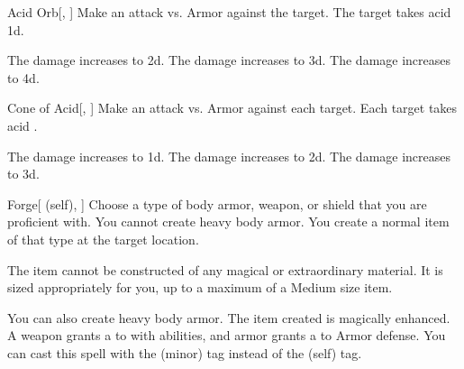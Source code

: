 \lowercase{\hypertarget{spell:Acid Orb}{}}\label{spell:Acid Orb}
\begin{freeability}[Rank 1]{\hypertarget{spell:Acid Orb}{Acid Orb}}[, ]
Make an attack vs. Armor against the target.
\hit The target takes acid  \plus1d.

\rankline
{} The damage increases to  \plus2d.
 The damage increases to  \plus3d.
 The damage increases to  \plus4d.
\end{freeability}
\vspace{0.25em}



\lowercase{\hypertarget{spell:Cone of Acid}{}}\label{spell:Cone of Acid}
\begin{freeability}[Rank 1]{\hypertarget{spell:Cone of Acid}{Cone of Acid}}[, ]
Make an attack vs. Armor against each target.
\hit Each target takes acid .

\rankline
{} The damage increases to  \plus1d.
 The damage increases to  \plus2d.
 The damage increases to  \plus3d.
\end{freeability}
\vspace{0.25em}



\lowercase{\hypertarget{spell:Forge}{}}\label{spell:Forge}
\begin{attuneability}[Rank 1]{\hypertarget{spell:Forge}{Forge}}[ (self), ]
Choose a type of body armor, weapon, or shield that you are proficient with.
You cannot create heavy body armor.
You create a normal item of that type at the target location.

The item cannot be constructed of any magical or extraordinary material.
It is sized appropriately for you, up to a maximum of a Medium size item.

\rankline
{} You can also create heavy body armor.
 The item created is magically enhanced.
A weapon grants a   to  with  abilities,
and armor grants a   to Armor defense.
 You can cast this spell with the  (minor) tag instead of the  (self) tag.
\end{attuneability}
\vspace{0.25em}



